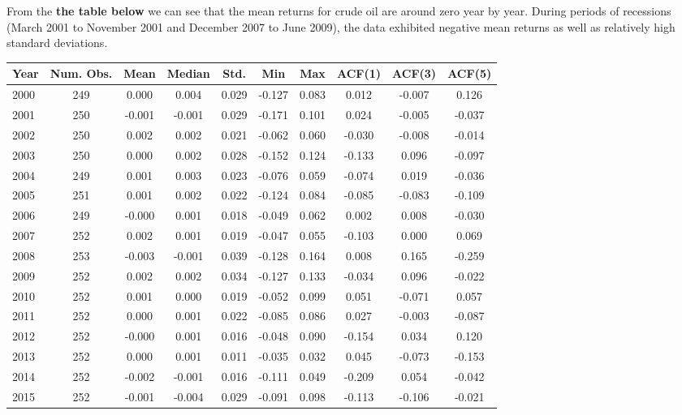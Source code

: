 \documentclass[12pt]{article}
\begin{document}
	\par From the \textbf{the table below} we can see that the mean returns for crude oil are around zero year by year. During periods of recessions (March 2001 to November 2001 and December 2007 to June 2009), the data exhibited negative mean returns as well as relatively high standard deviations.
	\begin{table}[H]
		\small
		\centering
		\begin{tabular}{l|c c c c c c c c c}
			\toprule
			Year & Num. Obs. & Mean & Median & Std. & Min & Max & ACF(1) & ACF(3) & ACF(5) \\
			\midrule
			2000 & 249 & 0.000 & 0.004 & 0.029 & -0.127 & 0.083 & 0.012 & -0.007 & 0.126 \\
			2001 & 250 & -0.001 & -0.001 & 0.029 & -0.171 & 0.101 & 0.024 & -0.005 & -0.037 \\
			2002 & 250 & 0.002 & 0.002 & 0.021 & -0.062 & 0.060 & -0.030 & -0.008 & -0.014 \\
			2003 & 250 & 0.000 & 0.002 & 0.028 & -0.152 & 0.124 & -0.133 & 0.096 & -0.097 \\
			2004 & 249 & 0.001 & 0.003 & 0.023 & -0.076 & 0.059 & -0.074 & 0.019 & -0.036 \\
			2005 & 251 & 0.001 & 0.002 & 0.022 & -0.124 & 0.084 & -0.085 & -0.083 & -0.109 \\
			2006 & 249 & -0.000 & 0.001 & 0.018 & -0.049 & 0.062 & 0.002 & 0.008 & -0.030 \\
			2007 & 252 & 0.002 & 0.001 & 0.019 & -0.047 & 0.055 & -0.103 & 0.000 & 0.069 \\
			2008 & 253 & -0.003 & -0.001 & 0.039 & -0.128 & 0.164 & 0.008 & 0.165 & -0.259 \\
			2009 & 252 & 0.002 & 0.002 & 0.034 & -0.127 & 0.133 & -0.034 & 0.096 & -0.022 \\
			2010 & 252 & 0.001 & 0.000 & 0.019 & -0.052 & 0.099 & 0.051 & -0.071 & 0.057 \\
			2011 & 252 & 0.000 & 0.001 & 0.022 & -0.085 & 0.086 & 0.027 & -0.003 & -0.087 \\
			2012 & 252 & -0.000 & 0.001 & 0.016 & -0.048 & 0.090 & -0.154 & 0.034 & 0.120 \\
			2013 & 252 & 0.000 & 0.001 & 0.011 & -0.035 & 0.032 & 0.045 & -0.073 & -0.153 \\
			2014 & 252 & -0.002 & -0.001 & 0.016 & -0.111 & 0.049 & -0.209 & 0.054 & -0.042 \\
			2015 & 252 & -0.001 & -0.004 & 0.029 & -0.091 & 0.098 & -0.113 & -0.106 & -0.021 \\

\end{tabular}
\end{table}
\end{document}
